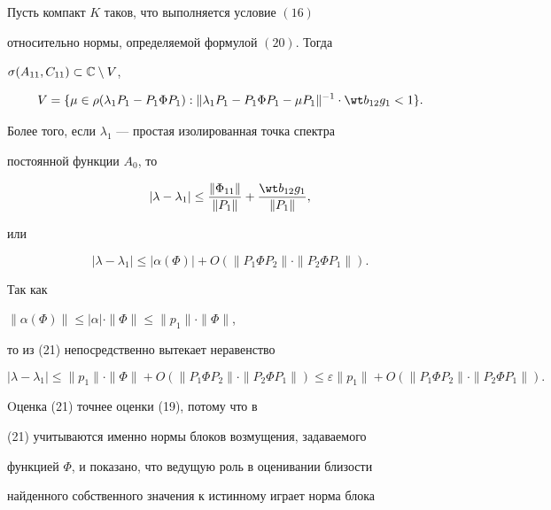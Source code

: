 \begin{thm}


Пусть компакт $K$ таков, что выполняется условие $(16)$


относительно нормы, определяемой формулой $(20)$. Тогда


$\sigma(A_{11},C_{11})\subset\Bbb{C}\setminus V$,


$$


V=\{\mu\in\rho(\lambda_1P_1-P_1\Phi P_1):


\|\lambda_1P_1-P_1\Phi P_1-\mu P_1\|^{-1}\cdot\wt b_{12}g_1<1\}.


$$


Более того, если $\lambda_1$ --- простая изолированная точка спектра 


постоянной функции $A_0$, то


$$


|\lambda-\lambda_1|\le\frac{\|\Phi_{11}\|}{\|P_1\|}+


\frac{\wt b_{12}g_1}{\|P_1\|},


$$


или


\begin{equation}


|\lambda-\lambda_1|\le|\alpha(\Phi)|+O(\|P_1\Phi


P_2\|\cdot\|P_2\Phi P_1\|).


\end{equation}


\end{thm}





Так как


$\|\alpha(\Phi)\|\leq|\alpha|\cdot\|\Phi\|\leq\|p_1\|\cdot\|\Phi\|$,


то из (21) непосредственно вытекает неравенство


$$


|\lambda-\lambda_1|\leq\|p_1\|\cdot\|\Phi\|+O(\|P_1\Phi


P_2\|\cdot\|P_2\Phi P_1\|)\leq\varepsilon\|p_1\|+


O(\|P_1\Phi P_2\|\cdot\|P_2\Phi P_1\|).


$$


Oценка (21) точнее оценки (19), потому что в 


(21) учитываются именно нормы блоков возмущения, задаваемого


функцией $\Phi$, и показано, что ведущую роль в оценивании близости


найденного собственного значения к истинному играет норма блока


